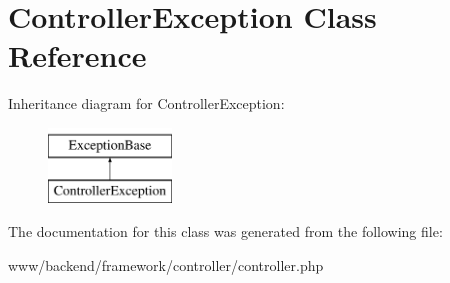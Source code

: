 \hypertarget{classControllerException}{
\section{ControllerException Class Reference}
\label{classControllerException}
}
Inheritance diagram for ControllerException:\begin{figure}[H]
\begin{center}
\leavevmode
\includegraphics[height=2.000000cm]{classControllerException}
\end{center}
\end{figure}


The documentation for this class was generated from the following file:\begin{DoxyCompactItemize}
\item 
www/backend/framework/controller/controller.php\end{DoxyCompactItemize}

